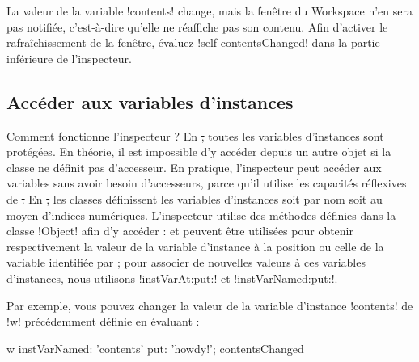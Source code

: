 \documentclass[a4paper,10pt,twoside]{book}
\begin{document}
La valeur de la variable \ct!contents! change, mais la fenêtre du Workspace n'en sera pas notifiée, c'est-à-dire qu'elle ne réaffiche pas son contenu.
Afin d'activer le rafraîchissement de la fenêtre, évaluez \ct!self contentsChanged! dans la partie inférieure de l'inspecteur.

\subsection{Accéder aux variables d'instances}

Comment fonctionne l'inspecteur ?
En \st, toutes les variables d'instances sont protégées.
En théorie, il est impossible d'y accéder depuis un autre objet si la classe ne définit pas d'accesseur.
En pratique, l'inspecteur peut accéder aux variables sans avoir besoin d'accesseurs, parce qu'il utilise les capacités réflexives de \st.
En \st, les classes définissent les variables d'instances soit par nom soit au moyen d'indices numériques.
L'inspecteur utilise des méthodes définies dans la classe \ct!Object! afin d'y accéder :   et  peuvent être utilisées pour obtenir respectivement la valeur de la variable d'instance à la position  ou celle de la variable identifiée par ; pour associer de nouvelles valeurs à ces variables d'instances, nous utilisons \ct!instVarAt:put:! et \ct!instVarNamed:put:!.

Par exemple, vous pouvez changer la valeur de la variable d'instance \ct!contents! de \ct!w! précédemment définie en évaluant :
\begin{code}{}
w instVarNamed: 'contents' put: 'howdy!'; contentsChanged
\end{code}

\end{document}
